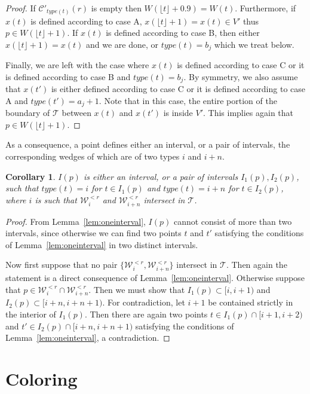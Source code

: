 \documentclass[english,11pt]{article}
\newtheorem{corollary}{Corollary}
\newcommand{\bigc}{\mathcal C}
\newcommand{\bigt}{\mathcal T}
\newcommand{\bigw}{\mathcal W}
\begin{document}
\begin{proof}
If $\bigc'_{type(t)}(r)$ is empty then $W(\lfloor t \rfloor {+}0.9)=W(t)$. 
Furthermore, if $x(t)$ is defined according to case A,
$x(\lfloor t \rfloor {+}1)=x(t)\in V'$ thus 
$p\in W(\lfloor t \rfloor {+}1)$.
If $x(t)$ is defined according to case B, then either 
$x(\lfloor t \rfloor {+}1)=x(t)$ and we are done, or $type(t)=b_j$ which
we treat below. 

Finally, we are left with the case where $x(t)$ is defined according
to case C or it is defined according to case B and $type(t)=b_j$. By
symmetry, we also assume that $x(t')$ is either defined according to
case C or it is defined according to case A and $type(t')=a_j{+}1$.
Note that in this case, the entire portion of the boundary of $\bigt$
between $x(t)$ and $x(t')$ is inside $V'$. This implies again that 
$p\in W(\lfloor t \rfloor {+}1)$.\end{proof}

As a consequence, a point defines either an interval, or a pair of intervals, the corresponding wedges of which are of two types $i$ and $i{+}n$.

\begin{corollary}
\label{cor:interval}
$I(p)$ is either an interval, or a pair of intervals $I_1(p) ,I_2(p)$, such that $type (t)=i$ for $t\in I_1(p)$ and $type(t)=i{+}n$ for $t\in I_2(p)$, where $i$ is such that $\bigw_i^{<r}$ and $\bigw_{i{+}n}^{<r}$ intersect in $\bigt$.
\end{corollary}
\begin{proof}
From Lemma~\ref{lem:oneinterval}, $I(p)$ cannot consist of more than two intervals, since otherwise we can find two points $t$ and $t'$ satisfying the conditions of Lemma~\ref{lem:oneinterval} in two distinct intervals.

Now first suppose  that no pair $\{\bigw_i^{<r},\bigw_{i{+}n}^{<r}\}$ intersect in $\bigt$. Then again the statement is a direct consequence of Lemma~\ref{lem:oneinterval}. Otherwise suppose that $p\in \bigw_i^{<r}\cap \bigw_{i{+}n}^{<r}$. Then we must show that $I_{1}(p)\subset [i,i{+}1)$ and $I_{2}(p)\subset [i{+}n,i{+}n{+}1)$. For contradiction, let $i{+}1$ be contained strictly in the interior of $I_{1}(p)$. Then there are again two points $t\in I_{1}(p)\cap [i{+}1,i{+}2)$ and $t'\in I_{2}(p)\cap [i{+}n,i{+}n{+}1)$ satisfying the conditions of Lemma~\ref{lem:oneinterval}, a contradiction.
\end{proof}

\section{Coloring}
\label{sec:coloring}
\end{document}
